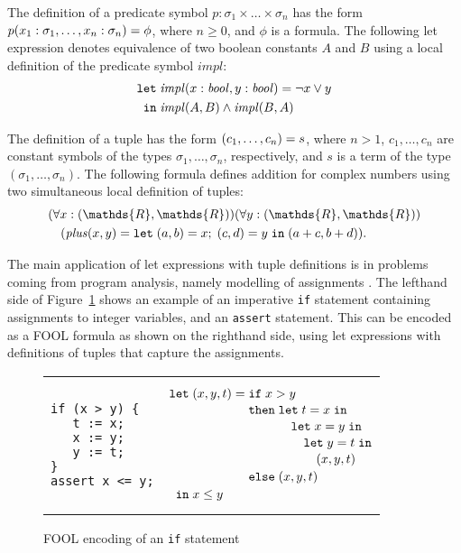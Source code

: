 \documentclass{easychair}
\begin{document}
The definition of a predicate symbol $p:\sigma_1\times\ldots\times\sigma_n$ has 
the form ${p(x_1:\sigma_1,\ldots,x_n:\sigma_n)}={\phi}$, where 
$n \geq 0$, and $\phi$ is a formula.
The following let expression denotes equivalence of two boolean constants 
$A$ and $B$ using a local definition of the predicate symbol $\mathit{impl}$:
\begin{equation}\label{eq:fool-let-impl2}
\begin{aligned}
\mathtt{let}\;&{\mathit{impl}(x:\mathit{bool},y:\mathit{bool})}={\neg x \lor y}\\
 \mathtt{in}\;&\mathit{impl}(A,B)\wedge\mathit{impl}(B,A)
\end{aligned}
\end{equation}

The definition of a tuple has the form ${(c_1,\ldots,c_n)}={s}$, where
$n > 1$, $c_1,\ldots,c_n$ are constant symbols of the types
$\sigma_1,\ldots,\sigma_n$, respectively, and $s$ is a term of the type
$(\sigma_1,\ldots,\sigma_n)$. 
The following formula defines addition for complex numbers using two 
simultaneous local definition of tuples:
\begin{equation}\label{eq:fool-tuple-let}
  \begin{aligned}
  &(\forall x:(\mathds{R},\mathds{R}))(\forall y:(\mathds{R},\mathds{R}))\\
  &\quad(\mathit{plus}(x,y) = \letinpar{(a,b)}{x}{(c,d)}{y}{\tuple{a+c,b+d}).}
  \end{aligned}
\end{equation}

The main application of let expressions with tuple definitions is in 
problems coming from program analysis, namely modelling of assignments
\cite{KKV18}.
The lefthand side of Figure~\ref{fig:simple-if} shows an example of an 
imperative \texttt{if} statement containing assignments to integer variables, 
and an \texttt{assert} statement. 
This can be encoded as a FOOL formula as shown on the righthand side, using 
let expressions with definitions of tuples that capture the assignments.

\begin{figure}[htbp]
\begin{center}
\begin{tabular}[t]{ll}
\begin{minipage}{0.3\textwidth}
\begin{verbatim}
if (x > y) {
   t := x;
   x := y;
   y := t;
}
assert x <= y;
\end{verbatim}
\end{minipage}
&
\begin{minipage}{0.3\textwidth}
\[
  \letnl{(x,y,t)}{\itenll{x > y}
                 {\letinnl{t}{x}
                          {\letinnl{x}{y}
                                   {\letinnl{y}{t}
                                            {(x,y,t)}}}}
                 {(x,y,t)}}
        {x \le y}
\]
\end{minipage}
\\
\end{tabular}
\end{center}
\caption{FOOL encoding of an {\tt if} statement}
\label{fig:simple-if}
\end{figure}
\end{document}
